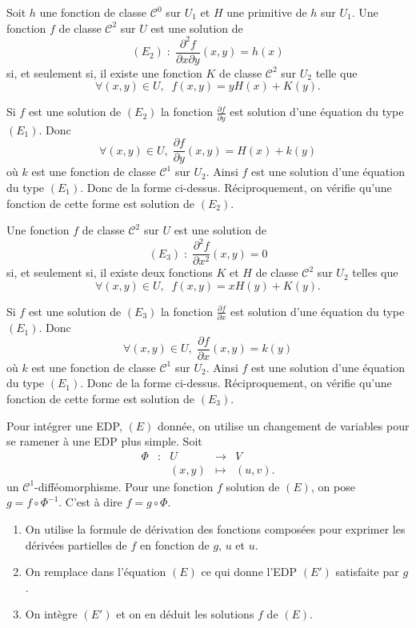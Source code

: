 \documentclass[12pt, class=report,crop=false]{standalone}
\begin{document}
\vskip6mm

\begin{proposition}Soit $h$ une fonction de classe $\mathscr{C}^0$ sur $U_1$ et $H$ une primitive de $h$ sur $U_1$. Une fonction $f$ de classe $\mathscr{C}^2$ sur $U$ est une solution de 
$$(E_2)\; :\; \frac{\partial ^2f}{\partial x\partial y}(x,y)=h(x)$$
si, et seulement si, il existe une fonction $K$ de classe $\mathscr{C}^2$ sur $U_2$ telle que
$$\forall (x,y)\in U,\; \; f(x,y)=yH(x)+K(y).$$
\end{proposition}

\vskip4mm

Si $f$ est une solution de $(E_2)$ la fonction $\displaystyle \frac{\partial f}{\partial y}$ est solution d'une équation du type $(E_1)$. Donc
$$\forall (x,y)\in U,\; \frac{\partial f}{\partial y}(x,y)=H(x)+k(y)$$
o\`u $k$ est une fonction de classe $\mathscr{C}^1$ sur $U_2$. Ainsi $f$ est une solution d'une équation du type $(E_1)$. Donc de la forme ci-dessus.  Réciproquement, on vérifie qu'une fonction de cette forme est solution de $(E_2)$.

\vskip6mm

\begin{proposition}Une fonction $f$ de classe $\mathscr{C}^2$ sur $U$ est une solution de 
$$(E_3)\; :\; \frac{\partial ^2f}{\partial x^2}(x,y)=0$$
si, et seulement si, il existe deux fonctions $K$ et $H$ de classe $\mathscr{C}^2$ sur $U_2$ telles que
$$\forall (x,y)\in U,\; \; f(x,y)=xH(y)+K(y).$$
\end{proposition}

\vskip4mm

Si $f$ est une solution de $(E_3)$ la fonction $\displaystyle \frac{\partial f}{\partial x}$ est solution d'une équation du type $(E_1)$. Donc
$$\forall (x,y)\in U,\; \frac{\partial f}{\partial x}(x,y)=k(y)$$
o\`u $k$ est une fonction de classe $\mathscr{C}^1$ sur $U_2$. Ainsi $f$ est une solution d'une équation du type $(E_1)$. Donc de la forme ci-dessus. Réciproquement, on vérifie qu'une fonction de cette forme est solution de $(E_3)$.

\vskip6mm

Pour intégrer une EDP, $(E)$ donnée, on utilise un changement de variables pour se ramener à une EDP plus simple. Soit
$$\begin{array}{ccccl}\Phi &:&U&\to&V\\&&(x,y)&\mapsto &\displaystyle (u,v).\end{array}$$
un $\mathscr{C}^1$-difféomorphisme. Pour une fonction $f$ solution de $(E)$, on pose $g=f\circ \Phi ^{-1}$. C'est à dire $f=g\circ \Phi$.
\begin{enumerate}
\item On utilise la formule de dérivation des fonctions composées pour exprimer les dérivées partielles de $f$ en fonction de $g$, $u$ et $u$.
\item On remplace dans l'équation $(E)$ ce qui donne l'EDP $(E')$ satisfaite par $g$.
\item On intègre $(E')$ et on en déduit les solutions $f$ de $(E)$.
\end{enumerate}
\end{document}
